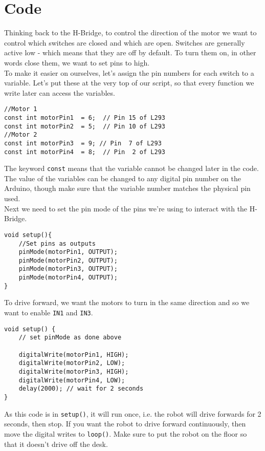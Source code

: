 \documentclass[../TinyBot.tex]{subfiles}
\begin{document}
\section{Code}





Thinking back to the H-Bridge, to control the direction of the motor we want to control which switches are closed and which are open. Switches are generally active low - which means that they are off by default. To turn them on, in other words close them, we want to set pins to high. \\

To make it easier on ourselves, let's assign the pin numbers for each switch to a variable. Let's put these at the very top of our script, so that every function we write later can access the variables. 

\begin{lstlisting}
//Motor 1
const int motorPin1  = 6;  // Pin 15 of L293
const int motorPin2  = 5;  // Pin 10 of L293
//Motor 2
const int motorPin3  = 9; // Pin  7 of L293
const int motorPin4  = 8;  // Pin  2 of L293
\end{lstlisting}

The keyword \lstinline[]!const! means that the variable cannot be changed later in the code. 
The value of the variables can be changed to any digital pin number on the Arduino, though make sure that the variable number matches the physical pin used. \\


Next we need to set the pin mode of the pins we're using to interact with the H-Bridge.

\begin{lstlisting}
void setup(){
    //Set pins as outputs
    pinMode(motorPin1, OUTPUT);
    pinMode(motorPin2, OUTPUT);
    pinMode(motorPin3, OUTPUT);
    pinMode(motorPin4, OUTPUT);
}
\end{lstlisting}


To drive forward, we want the motors to turn in the same direction and so we want to enable \lstinline[]!IN1! and \lstinline[]!IN3!. 

\begin{lstlisting}
void setup() {
    // set pinMode as done above

    digitalWrite(motorPin1, HIGH);
    digitalWrite(motorPin2, LOW);
    digitalWrite(motorPin3, HIGH);
    digitalWrite(motorPin4, LOW);
    delay(2000); // wait for 2 seconds
}
\end{lstlisting}
As this code is in \lstinline[]!setup()!, it will run once, i.e. the robot will drive forwards for 2 seconds, then stop. If you want the robot to drive forward continuously, then move the digital writes to \lstinline[]!loop()!. Make sure to put the robot on the floor so that it doesn't drive off the desk.
\end{document}
